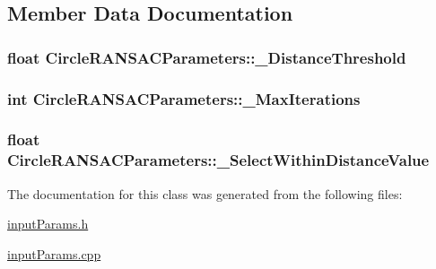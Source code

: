 \subsection{Member Data Documentation}
\hypertarget{classCircleRANSACParameters_a1002458dc1b6751e3188b1e1de076ac0}{
\subsubsection[{\-\_\-\-Distance\-Threshold}]{\setlength{\rightskip}{0pt plus 5cm}float Circle\-R\-A\-N\-S\-A\-C\-Parameters\-::\-\_\-\-Distance\-Threshold\hspace{0.3cm}{\ttfamily [private]}}}\label{classCircleRANSACParameters_a1002458dc1b6751e3188b1e1de076ac0}
\hypertarget{classCircleRANSACParameters_a32cb281a19a165fc4042f31e8ae5bb40}{
\subsubsection[{\-\_\-\-Max\-Iterations}]{\setlength{\rightskip}{0pt plus 5cm}int Circle\-R\-A\-N\-S\-A\-C\-Parameters\-::\-\_\-\-Max\-Iterations\hspace{0.3cm}{\ttfamily [private]}}}\label{classCircleRANSACParameters_a32cb281a19a165fc4042f31e8ae5bb40}
\hypertarget{classCircleRANSACParameters_a5d030b3d671442a82f571daf2d5f3d4a}{
\subsubsection[{\-\_\-\-Select\-Within\-Distance\-Value}]{\setlength{\rightskip}{0pt plus 5cm}float Circle\-R\-A\-N\-S\-A\-C\-Parameters\-::\-\_\-\-Select\-Within\-Distance\-Value\hspace{0.3cm}{\ttfamily [private]}}}\label{classCircleRANSACParameters_a5d030b3d671442a82f571daf2d5f3d4a}


The documentation for this class was generated from the following files\-:\begin{DoxyCompactItemize}
\item 
\hyperlink{inputParams_8h}{input\-Params.\-h}\item 
\hyperlink{inputParams_8cpp}{input\-Params.\-cpp}\end{DoxyCompactItemize}

